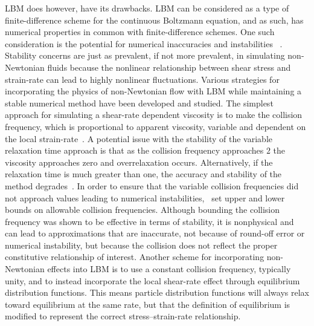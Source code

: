 LBM does however, have its drawbacks.
LBM can be considered as a type of finite-difference scheme for the continuous Boltzmann equation, and as such, has numerical properties in common with finite-difference schemes.
One such consideration is the potential for numerical inaccuracies and instabilities ~\cite{sterling1993stability,sterling1996stability,bawazeer2013stability,lallemand2000theory}. %
Stability concerns are just as prevalent, if not more prevalent, in simulating non-Newtonian fluids because the nonlinear relationship between shear stress and strain-rate can lead to highly nonlinear fluctuations. %
Various strategies for incorporating the physics of non-Newtonian flow with LBM while maintaining a stable numerical method have been developed and studied.
The simplest approach for simulating a shear-rate dependent viscosity is to make the collision frequency, which is proportional to apparent viscosity, variable and dependent on the local strain-rate~\cite{boyd2006second,chen2014simulations,fallah2012multiple,tang2011bingham,svec2011flow,svec2012free,zhao2016lattice}.
A potential issue with the stability of the variable relaxation time approach is that as the collision frequency approaches $2$ the viscosity approaches zero and overrelaxation occurs.
Alternatively, if the relaxation time is much greater than one, the accuracy and stability of the method degrades~\cite{latt2007hydrodynamic}. %
In order to ensure that the variable collision frequencies did not approach values leading to numerical instabilities,~\cite{svec2011flow,svec2012free,gabbanelli2005lattice} set upper and lower bounds on allowable collision frequencies.
Although bounding the collision frequency was shown to be effective in terms of stability, it is nonphysical and can lead to approximations that are inaccurate, not because of round-off error or numerical instability, but because the collision does not reflect the proper constitutive relationship of interest.
Another scheme for incorporating non-Newtonian effects into LBM is to use a constant collision frequency, typically unity, and to instead incorporate the local shear-rate effect through equilibrium distribution functions.
This means particle distribution functions will always relax toward equilibrium at the same rate, but that the definition of equilibrium is modified to represent the correct stress--strain-rate relationship.
